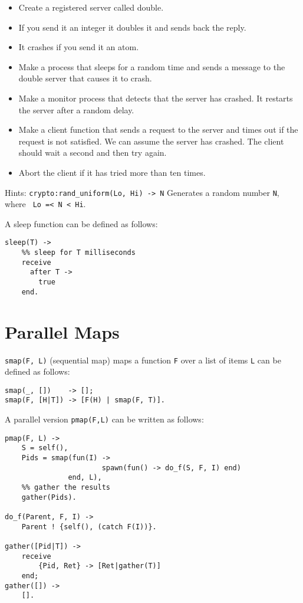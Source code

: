 \documentclass[12pt]{hitec}
\begin{document}
\begin{itemize}

\item Create a registered server called double.

\item If you send it an integer it doubles it and sends back the reply.

\item It crashes if you send it an atom.

\item Make a process that sleeps for a random time and sends a message
  to the double server that causes it to crash.

\item Make a monitor process that detects that the server has
  crashed. It restarts the server after a random delay.

\item Make a client function that sends a request to the server and
  times out if the request is not satisfied. We can assume the server
  has crashed. The client should wait a second and then try again.

\item  Abort the client if it has tried more than ten times.
\end{itemize}

Hints: \verb+crypto:rand_uniform(Lo, Hi) -> N+
Generates a random number \verb+N+, where \verb+ Lo =< N < Hi+.

A sleep function can be defined as follows:

\begin{Verbatim}
sleep(T) ->
    %% sleep for T milliseconds
    receive
      after T ->
        true
    end.
\end{Verbatim}

\section{Parallel Maps}

\verb+smap(F, L)+ (sequential map) maps a function \verb+F+ over a
list of items \verb+L+  can be defined as follows:

\begin{Verbatim}
smap(_, [])    -> [];
smap(F, [H|T]) -> [F(H) | smap(F, T)].
\end{Verbatim}

A parallel version \verb+pmap(F,L)+ can be written as follows:
\begin{Verbatim}
pmap(F, L) -> 
    S = self(),
    Pids = smap(fun(I) -> 
                       spawn(fun() -> do_f(S, F, I) end)
               end, L),
    %% gather the results
    gather(Pids).

do_f(Parent, F, I) ->                                          
    Parent ! {self(), (catch F(I))}.

gather([Pid|T]) ->
    receive
        {Pid, Ret} -> [Ret|gather(T)]
    end;
gather([]) ->
    [].
\end{Verbatim}
\end{document}
